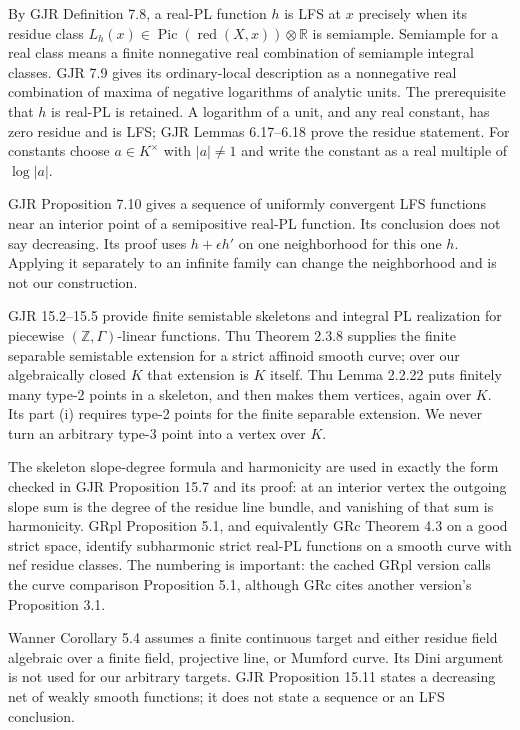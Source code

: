 \documentclass[11pt]{article}
\begin{document}
By GJR Definition 7.8, a real-PL function $h$ is LFS at $x$ precisely when its residue class $L_h(x)\in\operatorname{Pic}(\operatorname{red}(X,x))\otimes\mathbb R$ is semiample. Semiample for a real class means a finite nonnegative real combination of semiample integral classes. GJR 7.9 gives its ordinary-local description as a nonnegative real combination of maxima of negative logarithms of analytic units. The prerequisite that $h$ is real-PL is retained. A logarithm of a unit, and any real constant, has zero residue and is LFS; GJR Lemmas 6.17--6.18 prove the residue statement. For constants choose $a\in K^\times$ with $|a|\neq1$ and write the constant as a real multiple of $\log|a|$.

GJR Proposition 7.10 gives a sequence of uniformly convergent LFS functions near an interior point of a semipositive real-PL function. Its conclusion does not say decreasing. Its proof uses $h+\epsilon h'$ on one neighborhood for this one $h$. Applying it separately to an infinite family can change the neighborhood and is not our construction.

GJR 15.2--15.5 provide finite semistable skeletons and integral PL realization for piecewise $(\mathbb Z,\Gamma)$-linear functions. Thu Theorem 2.3.8 supplies the finite separable semistable extension for a strict affinoid smooth curve; over our algebraically closed $K$ that extension is $K$ itself. Thu Lemma 2.2.22 puts finitely many type-2 points in a skeleton, and then makes them vertices, again over $K$. Its part (i) requires type-2 points for the finite separable extension. We never turn an arbitrary type-3 point into a vertex over $K$.

The skeleton slope-degree formula and harmonicity are used in exactly the form checked in GJR Proposition 15.7 and its proof: at an interior vertex the outgoing slope sum is the degree of the residue line bundle, and vanishing of that sum is harmonicity. GRpl Proposition 5.1, and equivalently GRc Theorem 4.3 on a good strict space, identify subharmonic strict real-PL functions on a smooth curve with nef residue classes. The numbering is important: the cached GRpl version calls the curve comparison Proposition 5.1, although GRc cites another version's Proposition 3.1.

Wanner Corollary 5.4 assumes a finite continuous target and either residue field algebraic over a finite field, projective line, or Mumford curve. Its Dini argument is not used for our arbitrary targets. GJR Proposition 15.11 states a decreasing net of weakly smooth functions; it does not state a sequence or an LFS conclusion.
\end{document}
